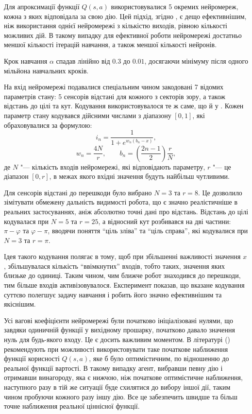 Для апроксимації функції $Q(s,a)$ використовувалися 5 окремих нейромереж, кожна з яких відповідала за свою дію. Цей підхід, згідно \cite{Rummery1995}, є дещо ефективнішим, ніж використання однієї нейромережі з кількістю виходів, рівною кількості можливих дій. В такому випадку для ефективної роботи нейромережі достатньо меншої кількості ітерацій навчання, а також меншої кількості нейронів.

Крок навчання $\alpha$ спадав лінійно від $0.3$ до $0.01$, досягаючи мінімуму після одного мільйона навчальних кроків.

На вхід нейромережі подавалися спеціальним чином закодовані 7 відомих параметрів стану: 5 сенсорів відстані для кожного з секторів зору, а також відстань до цілі та кут. Кодування використовувалося те ж саме, що й у \cite{Rummery1995}. Кожен параметр стану кодувався дійсними числами з діапазону $[0,1]$, які обраховувалися за формулою:
\[
    i_n = \frac{1}{1 + e^{w_n(b_n-x)}},
\]
\[
    w_n = \frac{4N}{r},\qquad b_n = \left(\frac{2n-1}{2}\right)\frac{r}{N},
\]
де $N$ "--- кількість входів нейромережі, які відповідають параметру, $r$ "--- це діапазон $[0,r]$, в межах якого вхідні значення будуть найбільш чутливими.

Для сенсорів відстані до перешкоди було вибрано $N = 3$ та $r = 8$. Це дозволило зімітувати обмежену дальність видимості робота, що є значно реалістичніше в реальних застосуваннях, аніж абсолютно точні дані про відстань. Відстань до цілі кодувалася при $N = 5$ та $r = 25$, а відносний кут розбивався на дві частини: $\pi - \varphi$ та $\varphi - \pi$, вводячи поняття ``ціль зліва'' та ``ціль справа'', які кодувалися при $N = 3$ та $r = \pi$.

Ідея такого кодування полягає в тому, щоб при збільшенні важливості значення $x$, збільшувалася кількість ``ввімкнутих'' входів, тобто таких, значення яких близьке до одиниці. Таким чином, чим ближче робот знаходився до перешкоди, тим більше входів активізовувалося. Експеримент показав, що вказане кодування суттєво полегшує задачу навчання і робить його значно ефективнішим та якіснішим.

Усі вагові коефіцієнти нейромережі були початково ініціалізовані нулями, що завдяки одиничній функції у вихідному прошарку, початково давало значення нуль для будь-якого входу. Це є досить важливим моментом. В літературі (\cite{SuttonBarto2002}) рекомендують при можливості використовувати таке початкове наближення функції корисності $Q(s,a)$, яке б було оптимістичним, по відношенню до реальної функції вартості. В такому випадку агент, вибравши певну дію і отримавши винагороду, яка є нижчою, ніж початкове оптимістичне наближення, наступного разу в тій же ситуації буде схилятися до вибору іншої дії, таким чином пробуючи кожного разу іншу дію. Все це забезпечить швидше та більш точне наближення реальної ціннісної функції.

